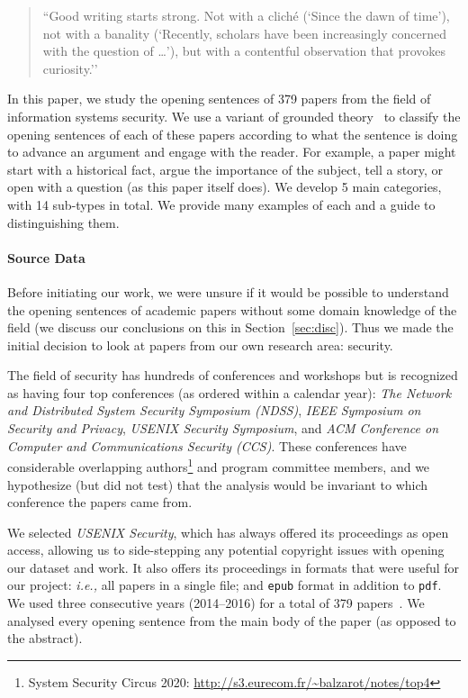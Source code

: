 \documentclass[sigconf,anonymous]{acmart}
\newcommand{\ie}{\textit{i.e.,}\xspace}
\begin{document}
\begin{quote}
``Good writing starts strong. Not with a cliché (`Since the dawn of time’), not with a banality (`Recently, scholars have been increasingly concerned with the question of …’), but with a contentful observation that provokes curiosity.''~\cite{Pin15}
\end{quote}

In this paper, we study the opening sentences of 379 papers from the field of information systems security. We use a variant of grounded theory~\cite{glaser1968discovery} to classify the opening sentences of each of these papers according to what the sentence is doing to advance an argument and engage with the reader. For example, a paper might start with a historical fact, argue the importance of the subject, tell a story, or open with a question (as this paper itself does). We develop 5 main categories, with 14 sub-types in total. We provide many examples of each and a guide to distinguishing them.

\paragraph{Source Data} Before initiating our work, we were unsure if it would be possible to understand the opening sentences of academic papers without some domain knowledge of the field (we discuss our conclusions on this in Section~\ref{sec:disc}). Thus we made the initial decision to look at papers from our own research area: security.

The field of security has hundreds of conferences and workshops but is recognized as having four top conferences (as ordered within a calendar year): \textit{The Network and Distributed System Security Symposium (NDSS)}, \textit{IEEE Symposium on Security and Privacy}, \textit{USENIX Security Symposium}, and \textit{ACM Conference on Computer and Communications Security (CCS)}. These conferences have considerable overlapping authors\footnote{System Security Circus 2020: \url{http://s3.eurecom.fr/~balzarot/notes/top4}} and program committee members, and we hypothesize (but did not test) that the analysis would be invariant to which conference the papers came from.

We selected \textit{USENIX Security}, which has always offered its proceedings as open access, allowing us to side-stepping any potential copyright issues with opening our dataset and work. It also offers its proceedings in formats that were useful for our project: \ie all papers in a single file; and \texttt{epub} format in addition to \texttt{pdf}. We used three consecutive years (2014--2016) for a total of 379 papers~\cite{usenix14,usenix15,usenix16}. We analysed every opening sentence from the main body of the paper (as opposed to the abstract).
\end{document}
